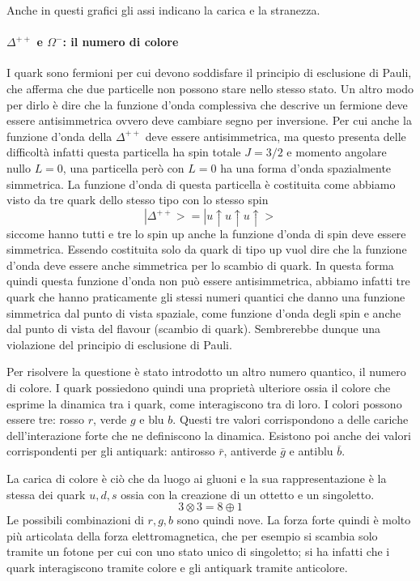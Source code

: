 Anche in questi grafici gli assi indicano la carica e la stranezza.

\paragraph{$\Delta^{++}$ e $\Omega^-$: il numero di colore}
I quark sono fermioni per cui devono soddisfare il principio di esclusione di Pauli, che afferma che due particelle non possono stare nello stesso stato.
Un altro modo per dirlo è dire che la funzione d'onda complessiva che descrive un fermione deve essere antisimmetrica ovvero deve cambiare segno per inversione.
Per cui anche la funzione d'onda della $\Delta^{++}$ deve essere antisimmetrica, ma questo presenta delle difficoltà infatti questa particella ha spin totale $J=3/2$ e momento angolare nullo $L=0$, una particella però con $L=0$ ha una forma d'onda spazialmente simmetrica.
La funzione d'onda di questa particella è costituita come abbiamo visto da tre quark dello stesso tipo con lo stesso spin
\begin{equation}
|\Delta^{++}>=|u\uparrow u\uparrow u\uparrow>
\end{equation}
siccome hanno tutti e tre lo spin up anche la funzione d'onda di spin deve essere simmetrica.
Essendo costituita solo da quark di tipo up vuol dire che la funzione d'onda deve essere anche simmetrica per lo scambio di quark.
In questa forma quindi questa funzione d'onda non può essere antisimmetrica, abbiamo infatti tre quark che hanno praticamente gli stessi numeri quantici che danno una funzione simmetrica dal punto di vista spaziale, come funzione d'onda degli spin e anche dal punto di vista del flavour (scambio di quark).
Sembrerebbe dunque una violazione del principio di esclusione di Pauli.

Per risolvere la questione è stato introdotto un altro numero quantico, il numero di colore.
I quark possiedono quindi una proprietà ulteriore ossia il colore che esprime la dinamica tra i quark, come interagiscono tra di loro.
I colori possono essere tre: rosso $r$, verde $g$ e blu $b$.
Questi tre valori corrispondono a delle cariche dell'interazione forte che ne definiscono la dinamica.
Esistono poi anche dei valori corrispondenti per gli antiquark: antirosso $\bar{r}$, antiverde $\bar{g}$ e antiblu $\bar{b}$.

La carica di colore è ciò che da luogo ai gluoni e la sua rappresentazione è la stessa dei quark $u, d, s$ ossia con la creazione di un ottetto e un singoletto.
\begin{equation}
3 \otimes 3= 8 \oplus 1
\end{equation}
Le possibili combinazioni di $r, g, b$ sono quindi nove.
La forza forte quindi è molto più articolata della forza elettromagnetica, che per esempio si scambia solo tramite un  fotone per cui con uno stato unico di singoletto; si ha infatti che i quark interagiscono tramite colore e gli antiquark tramite anticolore.

